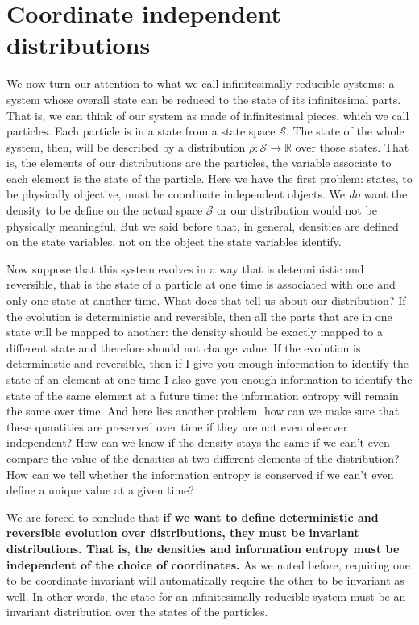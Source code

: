 \documentclass[11pt]{article}
\begin{document}
\section{Coordinate independent distributions}

We now turn our attention to what we call infinitesimally reducible systems: a system whose overall state can be reduced to the state of its infinitesimal parts. That is, we can think of our system as made of infinitesimal pieces, which we call particles. Each particle is in a state from a state space $\mathcal{S}$. The state of the whole system, then, will be described by a distribution $\rho : \mathcal{S} \to \mathbb{R}$ over those states. That is, the elements of our distributions are the particles, the variable associate to each element is the state of the particle. Here we have the first problem: states, to be physically objective, must be coordinate independent objects. We \emph{do} want the density to be define on the actual space $\mathcal{S}$ or our distribution would not be physically meaningful. But we said before that, in general, densities are defined on the state variables, not on the object the state variables identify.

Now suppose that this system evolves in a way that is deterministic and reversible, that is the state of a particle at one time is associated with one and only one state at another time. What does that tell us about our distribution? If the evolution is deterministic and reversible, then all the parts that are in one state will be mapped to another: the density should be exactly mapped to a different state and therefore should not change value. If the evolution is deterministic and reversible, then if I give you enough information to identify the state of an element at one time I also gave you enough information to identify the state of the same element at a future time: the information entropy will remain the same over time. And here lies another problem: how can we make sure that these quantities are preserved over time if they are not even observer independent? How can we know if the density stays the same if we can't even compare the value of the densities at two different elements of the distribution? How can we tell whether the information entropy is conserved if we can't even define a unique value at a given time?

We are forced to conclude that \textbf{if we want to define deterministic and reversible evolution over distributions, they must be invariant distributions. That is, the densities and information entropy must be independent of the choice of coordinates.} As we noted before, requiring one to be coordinate invariant will automatically require the other to be invariant as well. In other words, the state for an infinitesimally reducible system must be an invariant distribution over the states of the particles. 
\end{document}
